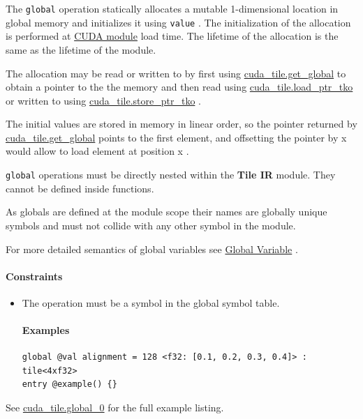\documentclass{article}
\begin{document}
The \texttt{global} operation statically allocates a mutable 1-dimensional location in global memory and initializes it using \texttt{value} . The initialization of the allocation is performed at \href{https://docs.nvidia.com/cuda/cuda-driver-api/group__CUDA__TYPES.html#group__CUDA__TYPES_1g9e4ef4dcfba4662b2299acb8d049a1ef}{CUDA module} load time. The lifetime of the allocation is the same as the lifetime of the module.


The allocation may be read or written to by first using \href{https://docs.nvidia.com/cuda/tile-ir/latest/sections/operations.html#op-cuda-tile-get-global}{cuda\_tile.get\_global} to obtain a pointer to the the memory and then read using \href{https://docs.nvidia.com/cuda/tile-ir/latest/sections/operations.html#op-cuda-tile-load-ptr-tko}{cuda\_tile.load\_ptr\_tko} or written to using \href{https://docs.nvidia.com/cuda/tile-ir/latest/sections/operations.html#op-cuda-tile-store-ptr-tko}{cuda\_tile.store\_ptr\_tko} .


The initial values are stored in memory in linear order, so the pointer returned by \href{https://docs.nvidia.com/cuda/tile-ir/latest/sections/operations.html#op-cuda-tile-get-global}{cuda\_tile.get\_global} points to the first element, and offsetting the pointer by x would allow to load element at position x .


\texttt{global} operations must be directly nested within the \textbf{Tile IR} module. They cannot be defined inside functions.

As globals are defined at the module scope their names are globally unique symbols and must not collide with any other symbol in the module.


For more detailed semantics of global variables see \href{https://docs.nvidia.com/cuda/tile-ir/latest/sections/semantics.html#sub-sec-tile-global}{Global Variable} .



\paragraph{Constraints}

\begin{itemize}
\item The operation must be a symbol in the global symbol table.


\paragraph{Examples}

\begin{lstlisting}
global @val alignment = 128 <f32: [0.1, 0.2, 0.3, 0.4]> : tile<4xf32>
entry @example() {}
\end{lstlisting}

\end{itemize}
See \href{https://docs.nvidia.com/cuda/tile-ir/latest/sections/appendix.html#example-cuda-tile-global-0}{cuda\_tile.global\_0} for the full example listing.
\end{document}
